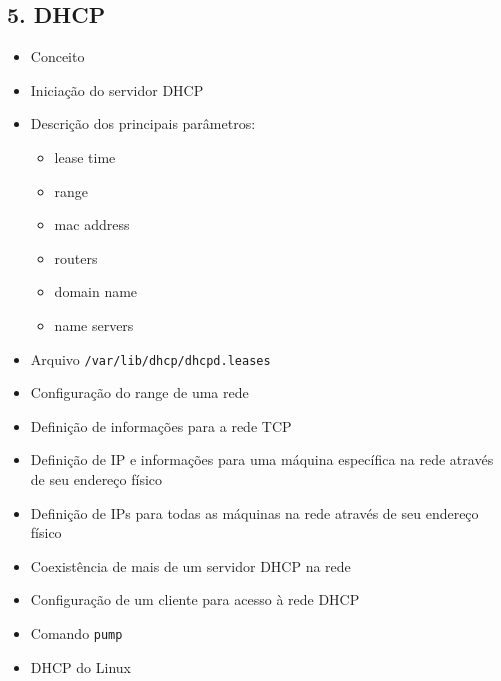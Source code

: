 \documentclass[12pt]{article}
\begin{document}
	\subsection*{5. DHCP}
	\begin{itemize}
		\item Conceito
		\item Iniciação do servidor DHCP
		\item Descrição dos principais parâmetros:
		\begin{itemize}
			\item lease time
			\item range
			\item mac address
			\item routers
			\item domain name
			\item name servers
		\end{itemize}
		\item Arquivo \texttt{/var/lib/dhcp/dhcpd.leases}
		\item Configuração do range de uma rede
		\item Definição de informações para a rede TCP
		\item Definição de IP e informações para uma máquina específica na rede através de seu endereço físico
		\item Definição de IPs para todas as máquinas na rede através de seu endereço físico
		\item Coexistência de mais de um servidor DHCP na rede
		\item Configuração de um cliente para acesso à rede DHCP
		\item Comando \texttt{pump}
		\item DHCP do Linux
	\end{itemize}
	
\end{document}

